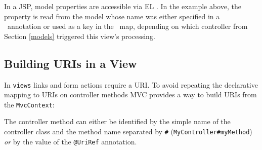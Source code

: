 In a JSP, model properties are accessible via EL \cite{el}. In the example above,
the property  is read from the  model whose name
was either specified in a \Named\ annotation or used as a key in the \Models\ map, 
depending on which controller from Section \ref{models} triggered this view's 
processing.

\subsection{Building URIs in a View}
\label{mvc_uri}

In {\tt views} links and form actions require a URI. To avoid repeating the declarative
mapping to URIs on controller methods MVC provides a way to build URIs from the
{\tt MvcContext}:


The controller method can either be identified by the simple name of the controller class
and the method name separated by {\tt \#} ({\tt MyController\#myMethod}) {\em or} by the
value of the {\tt @UriRef} annotation.

